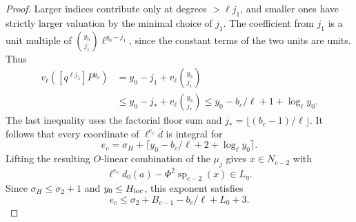 \begin{proof}
Larger indices contribute only at degrees \(>\ell j_1\),
and smaller ones have strictly larger valuation by the minimal
choice of \(j_1\). The coefficient from \(j_1\) is a unit
multiple of \(\binom{y_0}{j_1}\ell^{y_0-j_1}\), since the
constant terms of the two units are units. Thus
\[
 \begin{aligned}
 v_\ell([q^{\ell j_1}]P^{y_0})
   &= y_0-j_1+v_\ell\binom{y_0}{j_1}\\
   &\le y_0-j_*+v_\ell\binom{y_0}{j_*}
    \le y_0-b_c/\ell+1+\log_\ell y_0 .
 \end{aligned}
\]
The last inequality uses the factorial floor sum and
\(j_*=\lfloor(b_c-1)/\ell\rfloor\).
It follows that every coordinate of \(\ell^{e_c}\overline d\)
is integral for
\[
e_c=\sigma_H+\lceil y_0-b_c/\ell+2+\log_\ell y_0\rceil .
\]
Lifting the resulting \(O\)-linear combination of the \(\mu_j\)
gives \(x\in N_{c-2}\) with
\[
 \ell^{e_c}d_0(a)-\Phi^2\operatorname{sp}_{c-2}(x)\in L_\eta .
\]
Since \(\sigma_H\le\sigma_2+1\) and \(y_0\le H_{\rm loc}\),
this exponent satisfies
\[
 e_c\le \sigma_2+B_{c-1}-b_c/\ell+L_0+3 .
\]

\end{proof}
